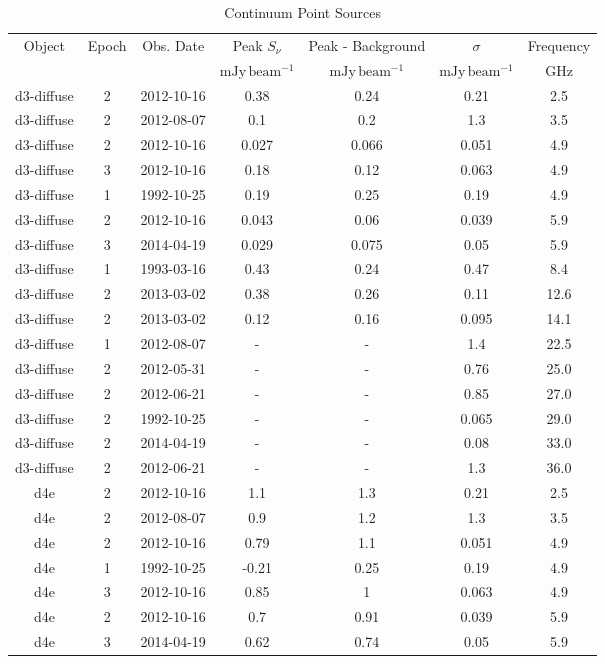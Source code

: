 \begin{table*}[htp]
\caption{Continuum Point Sources}
\begin{tabular}{ccccccc}
\label{tab:contsrcs_full}
Object & Epoch & Obs. Date & Peak $S_{\nu}$ & Peak - Background & $\sigma$ & Frequency \\
 &  &  & $\mathrm{mJy\,beam^{-1}}$ & $\mathrm{mJy\,beam^{-1}}$ & $\mathrm{mJy\,beam^{-1}}$ & $\mathrm{GHz}$ \\
\hline
d3-diffuse & 2 & 2012-10-16 & 0.38 & 0.24 & 0.21 & 2.5 \\
d3-diffuse & 2 & 2012-08-07 & 0.1 & 0.2 & 1.3 & 3.5 \\
d3-diffuse & 2 & 2012-10-16 & 0.027 & 0.066 & 0.051 & 4.9 \\
d3-diffuse & 3 & 2012-10-16 & 0.18 & 0.12 & 0.063 & 4.9 \\
d3-diffuse & 1 & 1992-10-25 & 0.19 & 0.25 & 0.19 & 4.9 \\
d3-diffuse & 2 & 2012-10-16 & 0.043 & 0.06 & 0.039 & 5.9 \\
d3-diffuse & 3 & 2014-04-19 & 0.029 & 0.075 & 0.05 & 5.9 \\
d3-diffuse & 1 & 1993-03-16 & 0.43 & 0.24 & 0.47 & 8.4 \\
d3-diffuse & 2 & 2013-03-02 & 0.38 & 0.26 & 0.11 & 12.6 \\
d3-diffuse & 2 & 2013-03-02 & 0.12 & 0.16 & 0.095 & 14.1 \\
d3-diffuse & 1 & 2012-08-07 & - & - & 1.4 & 22.5 \\
d3-diffuse & 2 & 2012-05-31 & - & - & 0.76 & 25.0 \\
d3-diffuse & 2 & 2012-06-21 & - & - & 0.85 & 27.0 \\
d3-diffuse & 2 & 1992-10-25 & - & - & 0.065 & 29.0 \\
d3-diffuse & 2 & 2014-04-19 & - & - & 0.08 & 33.0 \\
d3-diffuse & 2 & 2012-06-21 & - & - & 1.3 & 36.0 \\
d4e & 2 & 2012-10-16 & 1.1 & 1.3 & 0.21 & 2.5 \\
d4e & 2 & 2012-08-07 & 0.9 & 1.2 & 1.3 & 3.5 \\
d4e & 2 & 2012-10-16 & 0.79 & 1.1 & 0.051 & 4.9 \\
d4e & 1 & 1992-10-25 & -0.21 & 0.25 & 0.19 & 4.9 \\
d4e & 3 & 2012-10-16 & 0.85 & 1 & 0.063 & 4.9 \\
d4e & 2 & 2012-10-16 & 0.7 & 0.91 & 0.039 & 5.9 \\
d4e & 3 & 2014-04-19 & 0.62 & 0.74 & 0.05 & 5.9 \\

\end{tabular}
\end{table*}

